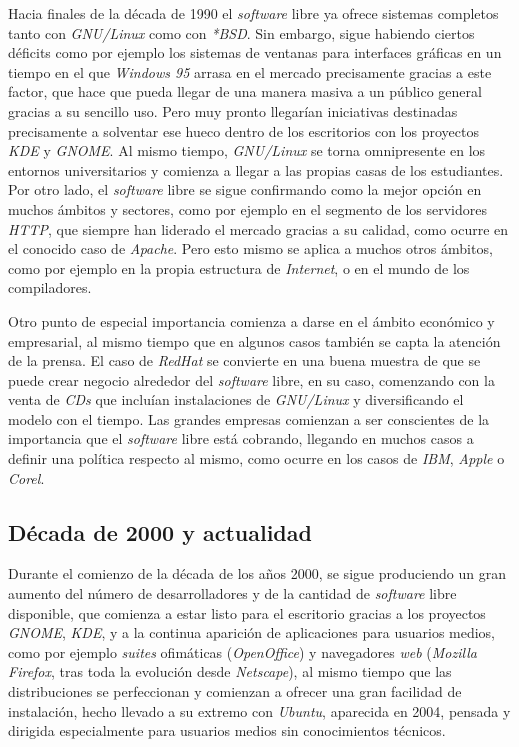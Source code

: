 Hacia finales de la década de 1990 el \textit{software} libre ya ofrece sistemas
completos tanto con \textit{GNU/Linux} como con \textit{*BSD}. Sin embargo,
sigue habiendo ciertos déficits como por ejemplo los sistemas de ventanas para
interfaces gráficas en un tiempo en el que \textit{Windows 95} arrasa en el
mercado precisamente gracias a este factor, que hace que pueda llegar de una
manera masiva a un público general gracias a su sencillo uso. Pero muy pronto
llegarían iniciativas destinadas precisamente a solventar ese hueco dentro de
los escritorios con los proyectos \textit{KDE} y \textit{GNOME}. Al mismo
tiempo, \textit{GNU/Linux} se torna omnipresente en los entornos universitarios
y comienza a llegar a las propias casas de los estudiantes. Por otro lado, el
\textit{software} libre se sigue confirmando como la mejor opción en muchos
ámbitos y sectores, como por ejemplo en el segmento de los servidores
\textit{HTTP}, que siempre han liderado el mercado gracias a su calidad, como
ocurre en el conocido caso de \textit{Apache}. Pero esto mismo se aplica a muchos
otros ámbitos, como por ejemplo en la propia estructura de \textit{Internet}, o
en el mundo de los compiladores.

Otro punto de especial importancia comienza a darse en el ámbito económico y
empresarial, al mismo tiempo que en algunos casos también se capta la atención
de la prensa. El caso de \textit{RedHat} se convierte en una buena muestra de
que se puede crear negocio alrededor del \textit{software} libre, en su caso,
comenzando con la venta de \textit{CDs} que incluían instalaciones de
\textit{GNU/Linux} y diversificando el modelo con el tiempo. Las grandes
empresas comienzan a ser conscientes de la importancia que el \textit{software}
libre está cobrando, llegando en muchos casos a definir una política respecto al
mismo, como ocurre en los casos de \textit{IBM}, \textit{Apple} o
\textit{Corel}.

\subsection{Década de 2000 y actualidad}

Durante el comienzo de la década de los años 2000, se sigue produciendo un
gran aumento del número de desarrolladores y de la cantidad de \textit{software}
libre disponible, que comienza a estar listo para el escritorio gracias a los
proyectos \textit{GNOME}, \textit{KDE}, y a la continua aparición de
aplicaciones para usuarios medios, como por ejemplo \textit{suites} ofimáticas
(\textit{OpenOffice}) y navegadores \textit{web} (\textit{Mozilla Firefox}, tras
toda la evolución desde \textit{Netscape}), al mismo tiempo que las
distribuciones se perfeccionan y comienzan a ofrecer una gran facilidad de
instalación, hecho llevado a su extremo con \textit{Ubuntu}, aparecida en 2004,
pensada y dirigida especialmente para usuarios medios sin conocimientos
técnicos.

